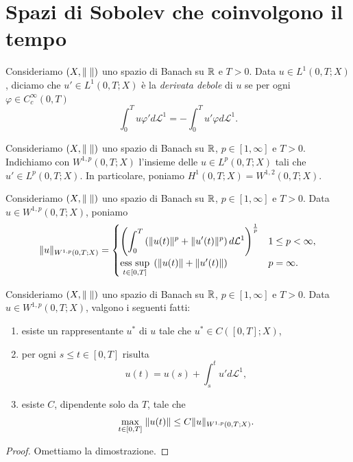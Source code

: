 \section{Spazi di Sobolev che coinvolgono il tempo}
\begin{definizione}
	Consideriamo $(X,\lVert\;\rVert)$ uno spazio di Banach su $\mathbb{R}$ e $T>0$. Data $u \in L^1(0,T;X)$, diciamo che $u' \in L^1(0,T;X)$ è la \emph{derivata debole} di $u$  se per ogni $\varphi \in C^\infty_c(0,T)$
	\[ \int_0^T u \varphi' d\mathcal{L}^1 = - \int_0^T u' \varphi d\mathcal{L}^1. \]
\end{definizione}

\begin{notazione}
	Consideriamo $(X,\lVert\;\rVert)$ uno spazio di Banach su $\mathbb{R}$, $p \in [1,\infty]$ e $T>0$. Indichiamo con  $W^{1,p}(0,T;X)$ l'insieme delle $u \in L^p(0,T;X)$ tali che $u' \in L^p(0,T;X)$. In particolare, poniamo $H^{1}(0,T;X) = W^{1,2}(0,T;X)$.
\end{notazione}

\begin{definizione}
	Consideriamo $(X,\lVert\;\rVert)$ uno spazio di Banach su $\mathbb{R}$, $p \in [1,\infty]$ e $T>0$. Data $u \in W^{1,p}(0,T;X)$, poniamo 
	\[ \lVert u\rVert_{W^{1,p}(0,T;X)} = \begin{cases}
		\left( \displaystyle \int_0^T \left( \lVert u(t)\rVert^p +  \lVert u'(t)\rVert^p\right)  d\mathcal{L}^1\right) ^{\frac{1}{p}} & 1 \le p < \infty, \\
		\underset{t \in [0,T]}{\textup{ess sup}}\;\left(  \lVert u(t)\rVert + \lVert u'(t)\rVert\right)  & p=\infty.
	\end{cases} \]
\end{definizione}

\begin{teorema}
	Consideriamo $(X,\lVert\;\rVert)$ uno spazio di Banach su $\mathbb{R}$, $p \in [1,\infty]$ e $T>0$. Data $u \in W^{1,p}(0,T;X)$, valgono i seguenti fatti:
	\begin{enumerate}[$(a)$]
		\item esiste un rappresentante $u^\ast$ di $u$ tale che $u^\ast \in C([0,T];X)$,
		\item per ogni $s\le t \in [0,T]$ risulta
		\[ u(t) = u(s) + \int_s^t u'd\mathcal{L}^1, \]
		\item esiste $C$, dipendente solo da $T$, tale che 
		\[ \underset{t \in [0,T]}{\max}\; \lVert u(t)\rVert \le C \lVert u\rVert_{W^{1,p}(0,T;X)}. \]
	\end{enumerate}
\end{teorema}
\begin{proof}
	Omettiamo la dimostrazione.
\end{proof}

